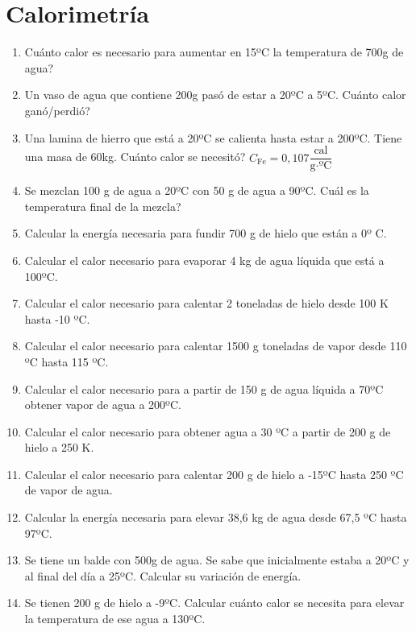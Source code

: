 \section{Calorimetría}

\begin{enumerate}
\item Cuánto calor es necesario para aumentar en 15ºC la temperatura de 700g de agua?

\item Un vaso de agua que contiene 200g pasó de estar a 20ºC a 5ºC. Cuánto calor ganó/perdió?

\item Una lamina de hierro que está a 20ºC se calienta hasta estar a 200ºC. Tiene una masa de 60kg. Cuánto calor se necesitó? $C_{\text{Fe}}=0,107 \dfrac{\text{cal}}{\text{g} \cdot \text{ºC}}$

\item Se mezclan 100 g de agua a 20ºC con 50 g de agua a 90ºC. Cuál es la temperatura final de la mezcla?

\item Calcular la energía necesaria para fundir 700 g de hielo que están a 0º C.

\item Calcular el calor necesario para evaporar 4 kg de agua líquida que está a 100ºC.

\item Calcular el calor necesario para calentar 2 toneladas de hielo desde 100 K hasta -10 ºC.

\item Calcular el calor necesario para calentar 1500 g toneladas de vapor desde 110 ºC hasta 115 ºC.

\item Calcular el calor necesario para a partir de 150 g de agua líquida a 70ºC obtener vapor de agua a 200ºC.

\item Calcular el calor necesario para obtener agua a 30 ºC a partir de 200 g de hielo a 250 K.

\item Calcular el calor necesario para calentar 200 g de hielo a -15ºC hasta 250 ºC de vapor de agua.

\item Calcular la energía necesaria para elevar 38,6 kg de agua desde 67,5 ºC hasta 97ºC.

\item Se tiene un balde con 500g de agua. Se sabe que inicialmente estaba a 20ºC y al final del día a 25ºC. Calcular su variación de energía.

\item Se tienen 200 g de hielo a -9ºC. Calcular cuánto calor se necesita para elevar la temperatura de ese agua a 130ºC.
\end{enumerate}

